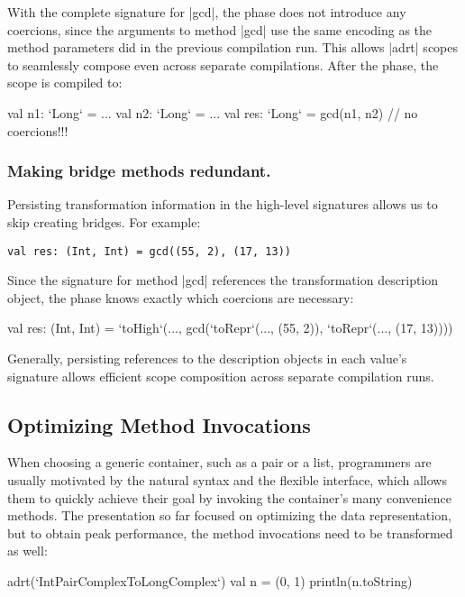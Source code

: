 With the complete signature for |gcd|, the \coerce{} phase does not introduce any coercions, since the arguments to method |gcd| use the same encoding as the method parameters did in the previous compilation run. This allows |adrt| scopes to seamlessly compose even across separate compilations. After the \commit{} phase, the scope is compiled to:

\begin{lstlisting-nobreak}
val n1: `Long` = ...
val n2: `Long` = ...
val res: `Long` = gcd(n1, n2) // no coercions!!!
\end{lstlisting-nobreak}


\subsubsection*{Making bridge methods redundant.} Persisting transformation information in the high-level signatures allows us to skip creating bridges. For example:


\begin{lstlisting}
val res: (Int, Int) = gcd((55, 2), (17, 13))
\end{lstlisting}

Since the signature for method |gcd| references the transformation description object, the \coerce{} phase knows exactly which coercions are necessary:

\begin{lstlisting-nobreak}
val res: (Int, Int) = `toHigh`(...,
  gcd(`toRepr`(..., (55, 2)), `toRepr`(..., (17, 13))))
\end{lstlisting-nobreak}

Generally, persisting references to the description objects in each value's signature allows efficient scope composition across separate compilation runs.


\subsection{Optimizing Method Invocations}
\label{sec:ildl:method}


When choosing a generic container, such as a pair or a list, programmers are usually motivated by the natural syntax and the flexible interface, which allows them to quickly achieve their goal by invoking the container's many convenience methods. The presentation so far focused on optimizing the data representation, but to obtain peak performance, the method invocations need to be transformed as well:

\begin{lstlisting-nobreak}
adrt(`IntPairComplexToLongComplex`) {
  val n = (0, 1)
  println(n.toString)
}
\end{lstlisting-nobreak}

